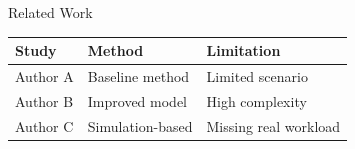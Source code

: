 \begin{frame}{Related Work}

\begin{center}
\small
\begin{tabular}{>{\RaggedRight\arraybackslash}p{} >{\RaggedRight\arraybackslash}p{} >{\RaggedRight\arraybackslash}p{}}
\toprule
\textbf{Study} & \textbf{Method} & \textbf{Limitation} \\
\midrule
Author A & Baseline method & Limited scenario \\
Author B & Improved model & High complexity \\
Author C & Simulation-based & Missing real workload \\
\bottomrule
\end{tabular}
\end{center}

\vspace{0.35cm}


\end{frame}

